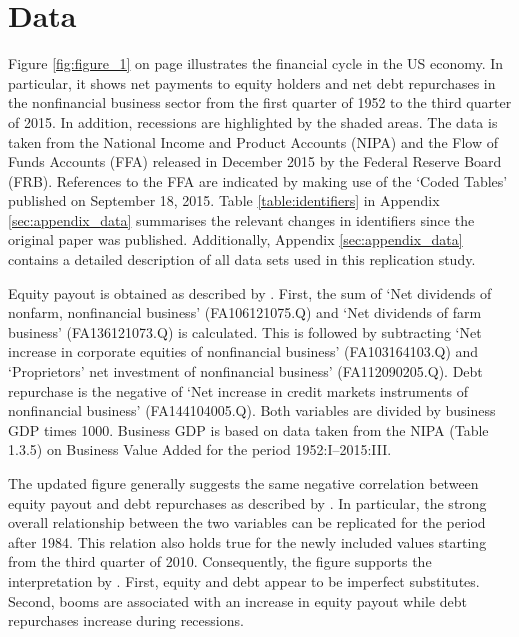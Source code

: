 \section{Data}
\label{sec:data}



Figure \ref{fig:figure_1} on page \pageref{fig:figure_1} illustrates the financial cycle in the US economy. In particular, it shows net payments to equity holders and net debt repurchases in the nonfinancial business sector from the first quarter of 1952 to the third quarter of 2015. In addition, recessions are highlighted by the shaded areas. The data is taken from the National Income and Product Accounts (NIPA) and the Flow of Funds Accounts (FFA) released in December 2015 by the Federal Reserve Board (FRB). References to the FFA are indicated by making use of the ‘Coded Tables’ published on September 18, 2015. Table \ref{table:identifiers} in Appendix \ref{sec:appendix_data} summarises the relevant changes in identifiers since the original paper was published. Additionally, Appendix \ref{sec:appendix_data} contains a detailed description of all data sets used in this replication study.

Equity payout is obtained as described by \citeauthor{JERMANNfinancial}. First, the sum of ‘Net dividends of nonfarm, nonfinancial business’ (FA106121075.Q) and ‘Net dividends of farm business’ (FA136121073.Q) is calculated. This is followed by subtracting ‘Net increase in corporate equities of nonfinancial business’ (FA103164103.Q) and ‘Proprietors’ net investment of nonfinancial business’ (FA112090205.Q). Debt repurchase is the negative of ‘Net increase in credit markets instruments of nonfinancial business’ (FA144104005.Q). Both variables are divided by business GDP times 1000. Business GDP is based on data taken from the NIPA (Table 1.3.5) on Business Value Added for the period 1952:I--2015:III.

The updated figure generally suggests the same negative correlation between equity payout and debt repurchases as described by \citeauthor{JERMANNfinancial}. In particular, the strong overall relationship between the two variables can be replicated for the period after 1984. This relation also holds true for the newly included values starting from the third quarter of 2010. Consequently, the figure supports the interpretation by \citeauthor{JERMANNfinancial}. First, equity and debt appear to be imperfect substitutes. Second, booms are associated with an increase in equity payout while debt repurchases increase during recessions.
